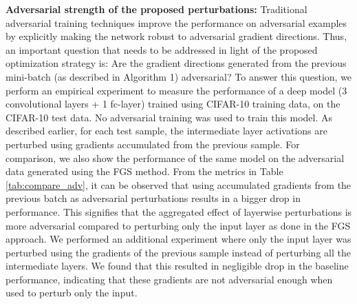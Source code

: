 \documentclass[letterpaper]{article} %
\begin{document}
\begin{table}
\centering
{}
\label{tab:compare_adv}
\end{table}
\textbf{Adversarial strength of the proposed perturbations:} Traditional adversarial training techniques improve the performance on adversarial examples by explicitly making the network robust to adversarial gradient directions. Thus, an important question that needs to be addressed in light of the proposed optimization strategy is: Are the gradient directions generated from the previous mini-batch (as described in Algorithm 1) adversarial? To answer this question, we perform an empirical experiment to measure the performance of a deep model (3 convolutional layers + 1 fc-layer) trained using CIFAR-10 training data, on the CIFAR-10 test data. No adversarial training was used to train this model. As described earlier, for each test sample, the intermediate layer activations are perturbed using gradients accumulated from the previous sample. For comparison, we also show the performance of the same model on the adversarial data generated using the FGS method. From the metrics in Table \ref{tab:compare_adv}, it can be observed that using accumulated gradients from the previous batch as adversarial perturbations results in a bigger drop in performance. This signifies that the aggregated effect of layerwise perturbations is more adversarial compared to perturbing only the input layer as done in the FGS approach. We performed an additional experiment where only the input layer was perturbed using the gradients of the previous sample instead of perturbing all the intermediate layers. We found that this resulted in negligible drop in the baseline performance, indicating that these gradients are not adversarial enough when used to perturb only the input.
\end{document}
